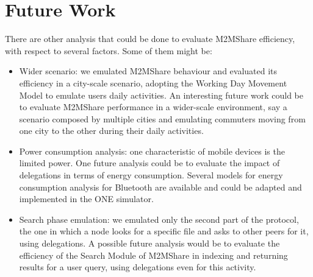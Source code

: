 \pagebreak
\section{Future Work}
There are other analysis that could be done to evaluate M2MShare efficiency, with respect to several factors. Some of them might be:
\begin{itemize}
\item Wider scenario: we emulated M2MShare behaviour and evaluated its efficiency in a city-scale scenario, adopting the Working Day Movement Model to emulate users daily activities. An interesting future work could be to evaluate M2MShare performance in a wider-scale environment, say a scenario composed by multiple cities and emulating commuters moving from one city to the other during their daily activities.
\item Power consumption analysis: one characteristic of mobile devices is the limited power. One future analysis could be to evaluate the impact of delegations in terms of energy consumption. Several models for  energy consumption analysis for Bluetooth are available and could be adapted and implemented in the ONE simulator.
\item Search phase emulation: we emulated only the second part of the protocol, the one in which a node looks for a specific file and asks to other peers for it, using delegations. A possible future analysis would be to evaluate the efficiency of the Search Module of M2MShare in indexing and returning results for a user query, using delegations even for this activity.
\end{itemize}



 
 

